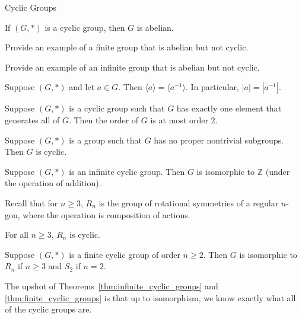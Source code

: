 \begin{section}{Cyclic Groups}
\begin{theorem}
If $(G,*)$ is a cyclic group, then $G$ is abelian.
\end{theorem}

\begin{exercise}
Provide an example of a finite group that is abelian but not cyclic.
\end{exercise}

\begin{exercise}
Provide an example of an infinite group that is abelian but not cyclic.
\end{exercise}

\begin{theorem}
Suppose $(G,*)$ and let $a\in G$. Then $\langle a\rangle=\langle a^{-1}\rangle$. In particular, $|a|=|a^{-1}|$.
\end{theorem}

\begin{theorem}
Suppose $(G,*)$ is a cyclic group such that $G$ has exactly one element that generates all of $G$.  Then the order of $G$ is at most order 2.   
\end{theorem}

\begin{theorem}
Suppose $(G,*)$ is a group such that $G$ has no proper nontrivial subgroups.  Then $G$ is cyclic.
\end{theorem}

\begin{theorem}\label{thm:infinite_cyclic_groups}
Suppose $(G,*)$ is an infinite cyclic group.  Then $G$ is isomorphic to $\mathbb{Z}$ (under the operation of addition).
\end{theorem}

Recall that for $n\geq3$, $R_n$ is the group of rotational symmetries of a regular $n$-gon, where the operation is composition of actions.

\begin{theorem}
For all $n\geq 3$, $R_n$ is cyclic.
\end{theorem}

\begin{theorem}\label{thm:finite_cyclic_groups}
Suppose $(G,*)$ is a finite cyclic group of order $n\geq 2$.  Then $G$ is isomorphic to $R_n$ if $n\geq 3$ and $S_2$ if $n=2$.
\end{theorem}

The upshot of Theorems~\ref{thm:infinite_cyclic_groups} and \ref{thm:finite_cyclic_groups} is that up to isomorphism, we know exactly what all of the cyclic groups are.


\end{section}
